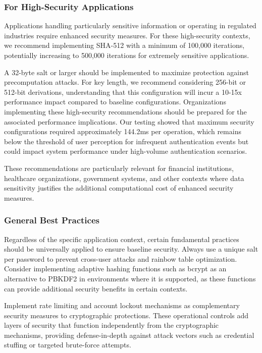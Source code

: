 \documentclass[11pt,a4paper]{article}
\begin{document}
\subsubsection{For High-Security Applications}
Applications handling particularly sensitive information or operating in regulated industries require enhanced security measures. For these high-security contexts, we recommend implementing SHA-512 with a minimum of 100,000 iterations, potentially increasing to 500,000 iterations for extremely sensitive applications.

A 32-byte salt or larger should be implemented to maximize protection against precomputation attacks. For key length, we recommend considering 256-bit or 512-bit derivations, understanding that this configuration will incur a 10-15x performance impact compared to baseline configurations.
Organizations implementing these high-security recommendations should be prepared for the associated performance implications. Our testing showed that maximum security configurations required approximately 144.2ms per operation, which remains below the threshold of user perception for infrequent authentication events but could impact system performance under high-volume authentication scenarios.

These recommendations are particularly relevant for financial institutions, healthcare organizations, government systems, and other contexts where data sensitivity justifies the additional computational cost of enhanced security measures.
\subsubsection{General Best Practices}
Regardless of the specific application context, certain fundamental practices should be universally applied to ensure baseline security. Always use a unique salt per password to prevent cross-user attacks and rainbow table optimization. Consider implementing adaptive hashing functions such as bcrypt as an alternative to PBKDF2 in environments where it is supported, as these functions can provide additional security benefits in certain contexts.

Implement rate limiting and account lockout mechanisms as complementary security measures to cryptographic protections. These operational controls add layers of security that function independently from the cryptographic mechanisms, providing defense-in-depth against attack vectors such as credential stuffing or targeted brute-force attempts.
\end{document}
